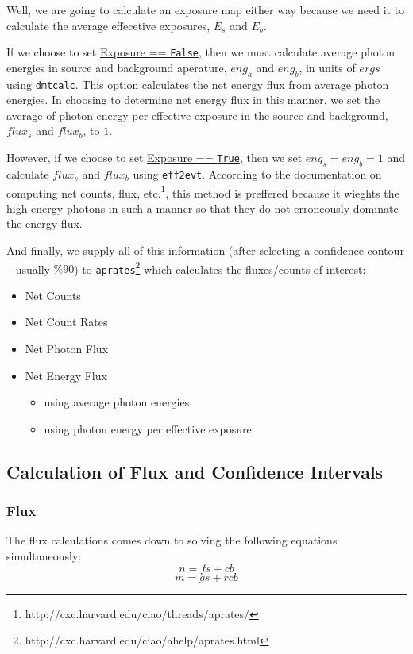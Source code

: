 \documentclass[11pt,letterpaper]{article}
\begin{document}
Well, we are going to calculate an exposure map either way because we need it to calculate the average effecetive exposures, $E_s$ and $E_b$. 

If we choose to set \underline{Exposure == \texttt{False}}, then we must calculate average photon energies in source and background aperature, $eng_a$ and $eng_b$, in units of $ergs$ using \texttt{dmtcalc}. This option calculates the net energy flux from average photon energies. In choosing to determine net energy flux in this manner, we set the average of photon energy per effective exposure in the source and background, $flux_s$ and $flux_b$, to $1$.

However, if we choose to set \underline{Exposure == \texttt{True}}, then we set $eng_s=eng_b=1$ and calculate $flux_s$ and $flux_b$ using \texttt{eff2evt}. According to the documentation on computing net counts, flux, etc.\footnote{http://cxc.harvard.edu/ciao/threads/aprates/}, this method is preffered because it wieghts the high energy photons in such a manner so that they do not erroneously dominate the energy flux.

And finally, we supply all of this information (after selecting a confidence contour -- usually $\%90$) to \texttt{aprates}\footnote{http://cxc.harvard.edu/ciao/ahelp/aprates.html} which calculates the fluxes/counts of interest:
\begin{itemize}
	\item Net Counts
	\item Net Count Rates
	\item Net Photon Flux
	\item Net Energy Flux 
	\begin{itemize}
		\item using average photon energies
		\item using photon energy per effective exposure
	\end{itemize} 
\end{itemize}


\subsection{Calculation of Flux and Confidence Intervals}
\subsubsection{Flux}
The flux calculations\cite{Primini2007} comes down to solving the following equations simultaneously:
\begin{equation}
	n = fs + cb
\end{equation}
\begin{equation}
	m = gs + rcb
\end{equation}
\end{document}
